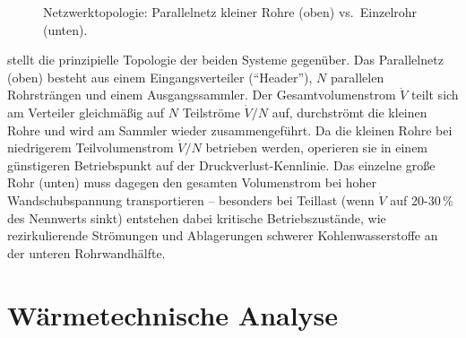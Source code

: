 ﻿\documentclass[12pt,a4paper,twoside]{article}
\theoremstyle{plain}
\theoremstyle{definition}
\theoremstyle{remark}
\newcommand{\dpL}{\Delta p / L}
\begin{document}
\begin{figure}
  \caption{Netzwerktopologie: Parallelnetz kleiner Rohre (oben) vs.\
           Einzelrohr (unten).}
  \label{fig:tikz_netzwerk}
\end{figure}

\noindent
{} stellt die prinzipielle Topologie der beiden
Systeme gegenüber.
Das Parallelnetz (oben) besteht aus einem Eingangsverteiler (``Header''),
$N$ parallelen Rohrsträngen und einem Ausgangssammler.
Der Gesamtvolumenstrom $\dot{V}$ teilt sich am Verteiler gleichmäßig auf
$N$ Teilströme $\dot{V}/N$ auf, durchströmt die kleinen Rohre und wird am
Sammler wieder zusammengeführt.
Da die kleinen Rohre bei niedrigerem Teilvolumenstrom $\dot{V}/N$ betrieben
werden, operieren sie in einem günstigeren Betriebspunkt auf der
Druckverlust-Kennlinie.
Das einzelne große Rohr (unten) muss dagegen den gesamten Volumenstrom
bei hoher Wandschubspannung transportieren -- besonders bei Teillast
(wenn $\dot{V}$ auf 20-30\,\% des Nennwerts sinkt) entstehen dabei
kritische Betriebszustände, wie rezirkulierende Strömungen und
Ablagerungen schwerer Kohlenwasserstoffe an der unteren Rohrwandhälfte.

\section{Wärmetechnische Analyse}
\label{sec:waerme}
\end{document}
